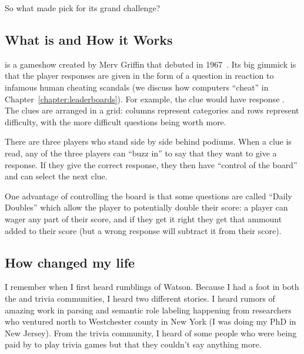 So what made  pick \jeopardy{} for its grand challenge?


\subsection{What \jeopardy{} is and How it Works}

\jeopardy{} is a gameshow created by Merv Griffin that debuted in 1967~\citep{griffin-03}.
%
Its big gimmick is that the player responses are given in the form of
a question in reaction to infamous human cheating scandals (we discuss how
computers ``cheat'' in Chapter~\ref{chapter:leaderboards}).
%
For example, the clue
would have response .
%
%
The clues are arranged in a grid: columns represent categories and
rows represent difficulty, with the more difficult questions being
worth more.

There are three players who stand side by side behind podiums.
%
When a clue is read, any of the three players can ``buzz in'' to say
that they want to give a response.
%
If they give the correct response, they then have ``control of the
board'' and can select the next clue.

One advantage of controlling the board is that some questions are
called ``Daily Doubles'' which allow the player to potentially double
their score: a player can wager any part of their score, and if they
get it right they get that ammount added to their score (but a wrong
response will subtract it from their score).

\subsection{How \watson{} changed my life}

I remember when I first heard rumblings of Watson.
%
Because I had a foot in both the  and trivia communities, I
heard two different stories.
%
I heard rumors of amazing work in parsing and semantic role labeling
happening from researchers who ventured north to Westchester county in New
York (I was doing my PhD in New Jersey).
%
From the trivia community, I heard of some people who were being paid
by  to play trivia games but that they couldn't say anything
more.

